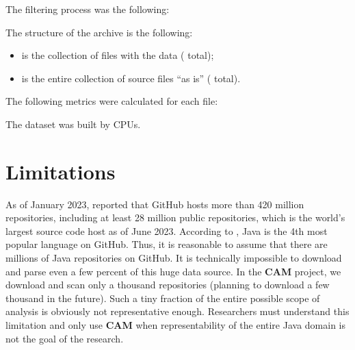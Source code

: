 \documentclass[sigplan,nonacm,review,anonymous]{acmart}
\newcommand\cam{{\sffamily\bfseries CAM}}
\begin{document}
The filtering process was the following:

\begin{enumerate}
\unskip{}
\end{enumerate}

The structure of the archive is the following:

\begin{itemize}

  \item {} is the collection of  files with the data
  (\unskip{} total);

  \item {} is the entire collection of
  \unskip{}
  source files ``as is''
  (\unskip{} total).

\end{itemize}

The following
\unskip{}
metrics were
calculated for each  file:

\begin{itemize}
  
\end{itemize}

The dataset was built by
\unskip{}
CPUs\unskip{}.

\section{Limitations}\label{sec:limitations}

As of January 2023, \citet{dohmke2023} reported that GitHub hosts more than
420 million repositories, including at least 28 million public repositories,
which is the world's largest source code host as of June 2023. According
to \citep{daigle2023}, Java is the 4th most popular language on GitHub. Thus,
it is reasonable to assume that there are millions of Java repositories on
GitHub. It is technically impossible to download and parse even a few percent
of this huge data source. In the \cam{} project, we download and scan only a
thousand repositories (planning to download a few thousand in the future).
Such a tiny fraction of the entire possible scope of analysis is obviously
not representative enough. Researchers must understand this limitation and
only use \cam{} when representability of the entire Java domain is not the
goal of the research.
\end{document}
